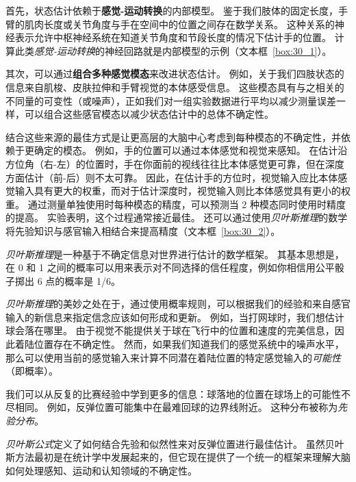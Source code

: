 首先，状态估计依赖于\textbf{感觉-运动转换}的内部模型。
鉴于我们肢体的固定长度，手臂的肌肉长度或关节角度与手在空间中的位置之间存在数学关系。
这种关系的神经表示允许中枢神经系统在知道关节角度和节段长度的情况下估计手的位置。
计算此类\textit{感觉-运动转换}的神经回路就是内部模型的示例（文本框~\ref{box:30_1}）。


其次，可以通过\textbf{组合多种感觉模态}来改进状态估计。
例如，关于我们四肢状态的信息来自肌梭、皮肤拉伸和手臂视觉的本体感受信息。
这些模态具有与之相关的不同量的可变性（或噪声），正如我们对一组实验数据进行平均以减少测量误差一样，可以组合这些感官模态以减少状态估计中的总体不确定性。


结合这些来源的最佳方式是让更高层的大脑中心考虑到每种模态的不确定性，并依赖于更确定的模态。
例如，手的位置可以通过本体感觉和视觉来感知。
在估计沿方位角（右-左）的位置时，手在你面前的视线往往比本体感觉更可靠，但在深度方面估计（前-后）则不太可靠。
因此，在估计手的方位时，视觉输入应比本体感觉输入具有更大的权重，而对于估计深度时，视觉输入则比本体感觉具有更小的权重。
通过测量单独使用时每种模态的精度，可以预测当 2 种模态同时使用时精度的提高。
实验表明，这个过程通常接近最佳。
还可以通过使用\textit{贝叶斯推理}的数学将先验知识与感官输入相结合来提高精度（文本框~\ref{box:30_2}）。


\begin{proposition}[贝叶斯推理] \label{box:30_2}
	
	\quad \quad \textit{贝叶斯推理}是一种基于不确定信息对世界进行估计的数学框架。
	其基本思想是，在 0 和 1 之间的概率可以用来表示对不同选择的信任程度，例如你相信用公平骰子掷出 6 点的概率是 1/6。
	
	\quad \quad \textit{贝叶斯推理}的美妙之处在于，通过使用概率规则，可以根据我们的经验和来自感官输入的新信息来指定信念应该如何形成和更新。
	例如，当打网球时，我们想估计球会落在哪里。
	由于视觉不能提供关于球在飞行中的位置和速度的完美信息，因此着陆位置存在不确定性。
	然而，如果我们知道我们的感觉系统中的噪声水平，那么可以使用当前的感觉输入来计算不同潜在着陆位置的特定感觉输入的\textit{可能性}（即概率）。
	
	\quad \quad 我们可以从反复的比赛经验中学到更多的信息：球落地的位置在球场上的可能性不尽相同。
	例如，反弹位置可能集中在最难回球的边界线附近。
	这种分布被称为\textit{先验分布}。
	
	\quad \quad \textit{贝叶斯公式}定义了如何结合先验和似然性来对反弹位置进行最佳估计。
	虽然贝叶斯方法最初是在统计学中发展起来的，但它现在提供了一个统一的框架来理解大脑如何处理感知、运动和认知领域的不确定性。
	
\end{proposition}


